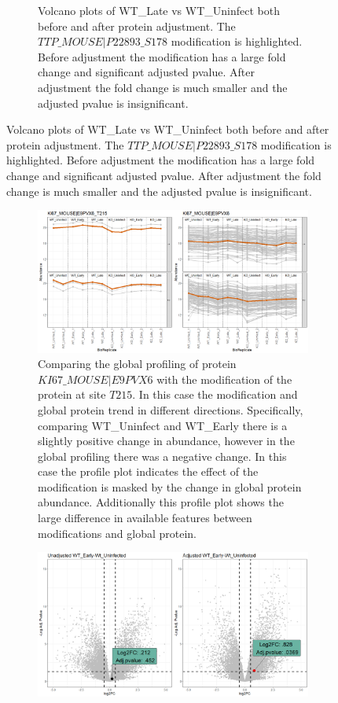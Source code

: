 \documentclass{mcp}
\begin{document}
\begin{figure}[h!]
\begin{subfigure}{\textwidth}
	\caption{Volcano plots of WT\_Late vs WT\_Uninfect both before and after protein adjustment. The $TTP\_MOUSE|P22893\_S178$ modification is highlighted. Before adjustment the modification has a large fold change and significant adjusted pvalue. After adjustment the fold change is much smaller and the adjusted pvalue is insignificant.}
 \end{subfigure}
\label{fig:No_Diff_Shigella_PTM}
\end{figure}

\begin{figure}[h!]
\centering
 \begin{subfigure}{\textwidth}
	\includegraphics[width=\textwidth]{sim_new/Difference_Shigella_Profile_Plot}
	\caption{Comparing the global profiling of protein $KI67\_MOUSE|E9PVX6$ with the modification of the protein at site $T215$. In this case the modification and global protein trend in different directions. Specifically, comparing WT\_Uninfect and WT\_Early there is a slightly positive change in abundance, however in the global profiling there was a negative change. In this case the profile plot indicates the effect of the modification is masked by the change in global protein abundance. Additionally this profile plot shows the large difference in available features between modifications and global protein.}
 \end{subfigure}
 \begin{subfigure}{\textwidth}
	\includegraphics[width=\textwidth]{sim_new/Difference_Shigella_Volcano}

\end{subfigure}
\end{figure}
\end{document}
